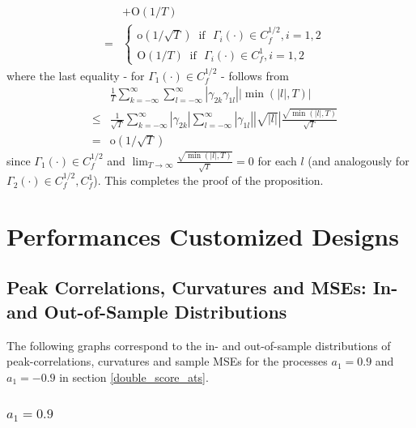 \documentclass[a4paper]{book}
\begin{document}
\begin{appendix}
\begin{eqnarray*}
&&+\textrm{O}(1/T) \\
&=&\left\{\begin{array}{cc}\textrm{o}(1/\sqrt{T})~\textrm{~if~~}\Gamma_i(\cdot)\in
C_f^{1/2}, i=1,2\\\textrm{O}(1/T)~\textrm{~if~~}\Gamma_i(\cdot)\in
C_f^{1}, i=1,2\end{array}\right.
\end{eqnarray*}
where the last equality - for $\Gamma_1(\cdot)\in C_f^{1/2}$ -
follows from
\begin{eqnarray*}
 &&\frac{1}{T}\sum_{k=-\infty}^\infty \sum_{l=-\infty}^\infty |\gamma_{2k}\gamma_{1l}||\min(|l|,T)|\\
 &\leq&
 \frac{1}{\sqrt{T}}\sum_{k=-\infty}^\infty |\gamma_{2k}|\sum_{l=-\infty}^\infty  |\gamma_{1l}||\sqrt{|l|}|\frac{\sqrt{\min(|l|,T)}}{\sqrt{T}}\\
&=&\textrm{o}(1/\sqrt{T})
\end{eqnarray*}
since $\Gamma_1(\cdot)\in C_f^{1/2}$ and
$\displaystyle{\lim_{T\to\infty}\frac{\sqrt{\min(|l|,T)}}{\sqrt{T}}}=0$
for each $l$ (and analogously for $\Gamma_2(\cdot)\in
C_f^{1/2},C_f^1$). This completes the proof of the proposition. \\






\section{Performances Customized Designs}\label{perf_cust_des_ap}


\subsection{Peak Correlations, Curvatures and MSEs: In- and Out-of-Sample Distributions}\label{app_double_score_ats}


The following graphs correspond to the in- and out-of-sample distributions of peak-correlations, curvatures and sample MSEs for the processes $a_1=0.9$ and $a_1=-0.9$ in section \ref{double_score_ats}.

\subsubsection{$a_1=0.9$}



\end{appendix}
\end{document}
